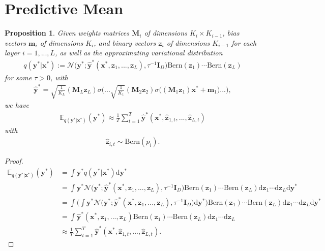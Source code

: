 \documentclass{article} %
\newcommand{\N}{\mathcal{N}}
\newcommand{\td}{\text{d}}
\newcommand{\x}{\mathbf{x}}
\newcommand{\sBb}{\mathtt{z}}
\newcommand{\y}{\mathbf{y}}
\newcommand{\m}{\mathbf{m}}
\newcommand{\I}{\mathbf{I}}
\newcommand{\M}{\mathbf{M}}
\newtheorem{proposition}{Proposition}
\theoremstyle{definition}
\begin{document}
\section{Predictive Mean}
\begin{proposition} \label{prop:mean}
Given weights matrices $\M_i$ of dimensions $K_i \times K_{i-1}$, bias vectors $\m_i$ of dimensions $K_i$, and binary vectors $\sBb_i$ of dimensions $K_{i-1}$ for each layer $i = 1, ..., L$, as well as the approximating variational distribution
\begin{align*}
q(\y^* | \x^*) := \N \big( \y^*; \widehat{\y}^*(\x^*, \sBb_1, ..., \sBb_L), \tau^{-1} \I_D \big) \text{Bern}(\sBb_1) \cdots \text{Bern}(\sBb_L)
\end{align*}
for some $\tau > 0$, with 
\begin{align*}
\widehat{\y}^* = \sqrt{\frac{1}{K_L}} (\M_L \sBb_L) \sigma \bigg( ... \sqrt{\frac{1}{K_1}} (\M_2 \sBb_2) \sigma \big( (\M_1 \sBb_1) \x^* + \m_1 \big) ... \bigg),
\end{align*}
we have 
\begin{align*}
\mathbb{E}_{q(\y^* | \x^*)} (\y^*) \approx \frac{1}{T} \sum_{t=1}^T \widehat{\y}^*(\x^*, \widehat{\sBb}_{1,t}, ..., \widehat{\sBb}_{L,t})
\end{align*}
with 
\begin{align*}
\widehat{\sBb}_{i,t} \sim \text{Bern}(p_i).
\end{align*}
\end{proposition}
\begin{proof}
\begin{align*}
\mathbb{E}_{q(\y^* | \x^*)} (\y^*) &= \int \y^* q(\y^* | \x^*) \td \y^* \\
&= \int \y^* \N \big( \y^*; \widehat{\y}^*(\x^*, \sBb_1, ..., \sBb_L), \tau^{-1} \I_D \big) \text{Bern}(\sBb_1) \cdots \text{Bern}(\sBb_L) \td \sBb_1 \cdots \td \sBb_L \td \y^* \\
&= \int \bigg( \int \y^* \N \big( \y^*; \widehat{\y}^*(\x^*, \sBb_1, ..., \sBb_L), \tau^{-1} \I_D \big) \td \y^* \bigg) \text{Bern}(\sBb_1) \cdots \text{Bern}(\sBb_L) \td \sBb_1 \cdots \td \sBb_L \td \y^* \\
&= \int \widehat{\y}^*(\x^*, \sBb_1, ..., \sBb_L) \text{Bern}(\sBb_1) \cdots \text{Bern}(\sBb_L) \td \sBb_1 \cdots \td \sBb_L \\
&\approx \frac{1}{T} \sum_{t=1}^T \widehat{\y}^*(\x^*, \widehat{\sBb}_{1,t}, ..., \widehat{\sBb}_{L,t}).
\end{align*}
\end{proof}
\end{document}
